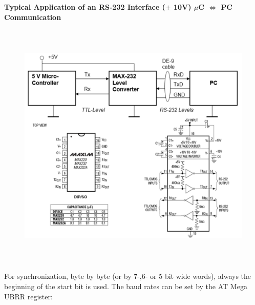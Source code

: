 \textbf{Typical Application of an RS-232 Interface ($\pm$ 10V) $\mu$C $\iff$ PC Communication}

    \begin{figure}[h]
    \centering
    \includegraphics[width=14cm, height=12cm]{Images/image46.png}
    \label{fig:Fig 143}
    \end{figure}

For synchronization, byte by byte (or by 7-,6- or 5 bit wide words), always the beginning of the start bit is used. The baud rates can be set by the AT Mega UBRR register:

